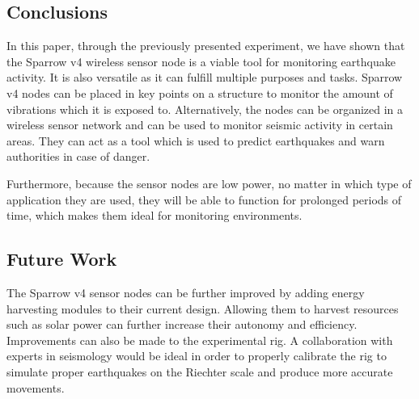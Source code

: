 \subsection{Conclusions}

In this paper, through the previously presented experiment, we have shown 
that the Sparrow v4 wireless sensor node is a viable tool for monitoring 
earthquake activity. It is also versatile as it can fulfill multiple purposes 
and tasks. Sparrow v4 nodes can be placed in key points on a structure to monitor 
the amount of vibrations which it is exposed to. Alternatively, the nodes can 
be organized in a wireless sensor network and can be used to monitor seismic activity 
in certain areas. They can act as a tool which is used to predict earthquakes and 
warn authorities in case of danger.

Furthermore, because the sensor nodes are low power, no matter in which type of application they 
are used, they will be able to function for prolonged periods of time, which makes them ideal 
for monitoring environments.

\subsection{Future Work}
The Sparrow v4 sensor nodes can be further improved by adding energy harvesting modules to their 
current design. Allowing them to harvest resources such as solar power can further increase 
their autonomy and efficiency. Improvements can also be made to the experimental rig. A collaboration 
with experts in seismology would be ideal in order to properly calibrate the rig to simulate 
proper earthquakes on the Riechter scale and produce more accurate movements.
